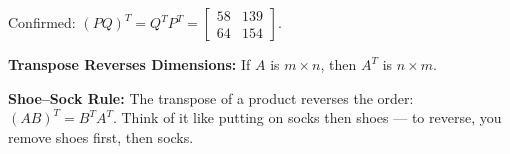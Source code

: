 \begin{solution}
\medskip
Confirmed: $(PQ)^T = Q^T P^T = \begin{bmatrix} 58 & 139 \\ 64 & 154 \end{bmatrix}$. \checkmark
\end{solution}

\begin{takeaways}
\item \textbf{Transpose Reverses Dimensions:} If $A$ is $m \times n$, then $A^T$ is $n \times m$.
\item \textbf{Shoe--Sock Rule:} The transpose of a product reverses the order: $(AB)^T = B^T A^T$. Think of it like putting on socks then shoes --- to reverse, you remove shoes first, then socks.
\end{takeaways}
